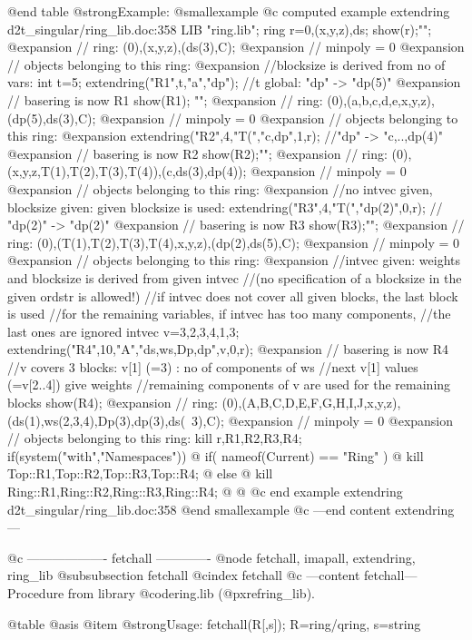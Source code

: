 @end table
@strong{Example:}
@smallexample
@c computed example extendring d2t_singular/ring_lib.doc:358 
LIB "ring.lib";
ring r=0,(x,y,z),ds;
show(r);"";
@expansion{} // ring: (0),(x,y,z),(ds(3),C);
@expansion{} // minpoly = 0
@expansion{} // objects belonging to this ring:
@expansion{} 
//blocksize is derived from no of vars:
int t=5;
extendring("R1",t,"a","dp");         //t global: "dp" -> "dp(5)"
@expansion{} // basering is now R1
show(R1); "";
@expansion{} // ring: (0),(a,b,c,d,e,x,y,z),(dp(5),ds(3),C);
@expansion{} // minpoly = 0
@expansion{} // objects belonging to this ring:
@expansion{} 
extendring("R2",4,"T(","c,dp",1,r);    //"dp" -> "c,..,dp(4)"
@expansion{} // basering is now R2
show(R2);"";
@expansion{} // ring: (0),(x,y,z,T(1),T(2),T(3),T(4)),(c,ds(3),dp(4));
@expansion{} // minpoly = 0
@expansion{} // objects belonging to this ring:
@expansion{} 
//no intvec given, blocksize given: given blocksize is used:
extendring("R3",4,"T(","dp(2)",0,r);   // "dp(2)" -> "dp(2)"
@expansion{} // basering is now R3
show(R3);"";
@expansion{} // ring: (0),(T(1),T(2),T(3),T(4),x,y,z),(dp(2),ds(5),C);
@expansion{} // minpoly = 0
@expansion{} // objects belonging to this ring:
@expansion{} 
//intvec given: weights and blocksize is derived from given intvec
//(no specification of a blocksize in the given ordstr is allowed!)
//if intvec does not cover all given blocks, the last block is used
//for the remaining variables, if intvec has too many components,
//the last ones are ignored
intvec v=3,2,3,4,1,3;
extendring("R4",10,"A","ds,ws,Dp,dp",v,0,r);
@expansion{} // basering is now R4
//v covers 3 blocks: v[1] (=3) : no of components of ws
//next v[1] values (=v[2..4]) give weights
//remaining components of v are used for the remaining blocks
show(R4);
@expansion{} // ring: (0),(A,B,C,D,E,F,G,H,I,J,x,y,z),(ds(1),ws(2,3,4),Dp(3),dp(3),ds(\
   3),C);
@expansion{} // minpoly = 0
@expansion{} // objects belonging to this ring:
kill r,R1,R2,R3,R4;
if(system("with","Namespaces")) @{
if( nameof(Current) == "Ring" ) @{
kill Top::R1,Top::R2,Top::R3,Top::R4;
@} else @{
kill Ring::R1,Ring::R2,Ring::R3,Ring::R4;
@}
@}
@c end example extendring d2t_singular/ring_lib.doc:358
@end smallexample
@c ---end content extendring---

@c ------------------- fetchall -------------
@node fetchall, imapall, extendring, ring_lib
@subsubsection fetchall
@cindex fetchall
@c ---content fetchall---
Procedure from library @code{ring.lib} (@pxref{ring_lib}).

@table @asis
@item @strong{Usage:}
fetchall(R[,s]); R=ring/qring, s=string

